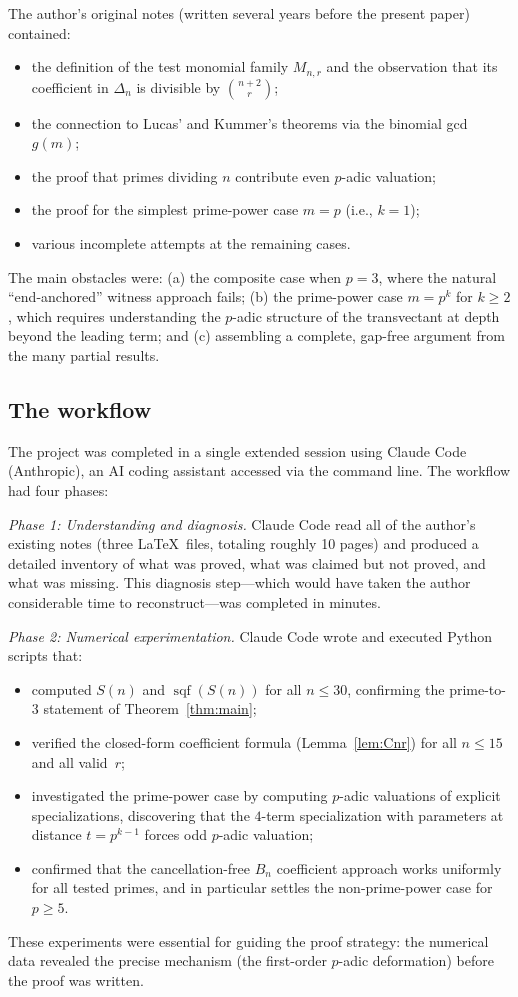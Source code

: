\documentclass[10pt]{amsart}
\theoremstyle{definition}
\theoremstyle{remark}
\DeclareMathOperator{\sqf}{sqf}
\begin{document}
The author's original notes (written several years before the present
paper) contained:
\begin{itemize}
\item the definition of the test monomial family $M_{n,r}$ and the
observation that its coefficient in $\Delta_n$ is divisible by
$\binom{n+2}{r}$;
\item the connection to Lucas' and Kummer's theorems via the binomial
gcd $g(m)$;
\item the proof that primes dividing $n$ contribute even $p$-adic
valuation;
\item the proof for the simplest prime-power case $m = p$ (i.e., $k=1$);
\item various incomplete attempts at the remaining cases.
\end{itemize}
The main obstacles were: (a) the composite case when $p = 3$, where
the natural ``end-anchored'' witness approach fails; (b) the
prime-power case $m = p^k$ for $k \ge 2$, which requires understanding
the $p$-adic structure of the transvectant at depth beyond the leading
term; and (c) assembling a complete, gap-free argument from the
many partial results.

\subsection*{The workflow}

The project was completed in a single extended session using Claude Code
(Anthropic), an AI coding assistant accessed via the command line.
The workflow had four phases:

\medskip
\emph{Phase 1: Understanding and diagnosis.}
Claude Code read all of the author's existing notes (three \LaTeX\ files,
totaling roughly 10 pages) and produced a detailed inventory of
what was proved, what was claimed but not proved, and what was missing.
This diagnosis step---which would have taken the author considerable time
to reconstruct---was completed in minutes.

\medskip
\emph{Phase 2: Numerical experimentation.}
Claude Code wrote and executed Python scripts that:
\begin{itemize}
\item computed $S(n)$ and $\sqf(S(n))$ for all $n \le 30$, confirming
the prime-to-$3$ statement of Theorem~\ref{thm:main};
\item verified the closed-form coefficient formula
(Lemma~\ref{lem:Cnr}) for all $n \le 15$ and all valid~$r$;
\item investigated the prime-power case by computing $p$-adic valuations
of explicit specializations, discovering that the $4$-term
specialization with parameters at distance $t = p^{k-1}$ forces odd
$p$-adic valuation;
\item confirmed that the cancellation-free $B_n$ coefficient approach
works uniformly for all tested primes, and in particular settles the
non-prime-power case for $p \ge 5$.
\end{itemize}
These experiments were essential for guiding the proof strategy: the
numerical data revealed the precise mechanism (the first-order
$p$-adic deformation) before the proof was written.
\end{document}
